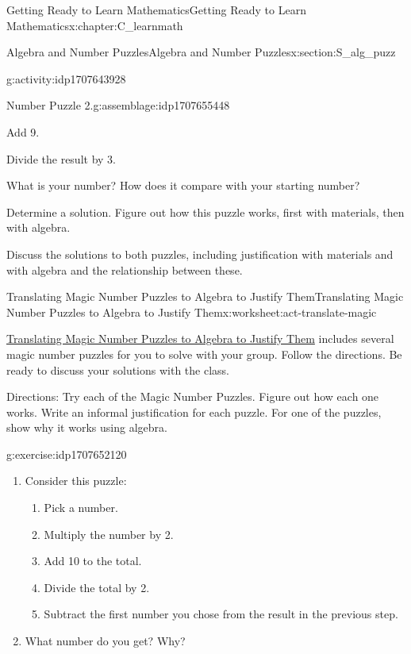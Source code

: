 \documentclass[oneside,10pt,]{book}
\numberwithin{equation}{chapter}
\begin{document}
\begin{chapterptx}{Getting Ready to Learn Mathematics}{}{Getting Ready to Learn Mathematics}{}{}{x:chapter:C_learnmath}
\begin{sectionptx}{Algebra and Number Puzzles}{}{Algebra and Number Puzzles}{}{}{x:section:S_alg_puzz}
\begin{activity}{}{g:activity:idp1707643928}
\begin{assemblage}{Number Puzzle 2.}{g:assemblage:idp1707655448}
\par
Add 9.%
\par
Divide the result by 3.%
\par
What is your number? How does it compare with your starting number?%
\end{assemblage}
 Determine a solution. Figure out how this puzzle works, first with materials, then with algebra.%
\par
Discuss the solutions to both puzzles, including justification with materials and with algebra and the relationship between these.%
\end{activity}%
%
%
\typeout{************************************************}
\typeout{************************************************}
%
\begin{worksheet-subsection}{Translating Magic Number Puzzles to Algebra to Justify Them}{}{Translating Magic Number Puzzles to Algebra to Justify Them}{}{}{x:worksheet:act-translate-magic}
\begin{introduction}{}%
\hyperref[x:worksheet:act-translate-magic]{Translating Magic Number Puzzles to Algebra to Justify Them} includes several magic number puzzles for you to solve with your group. Follow the directions. Be ready to discuss your solutions with the class.%
\par
Directions: Try each of the Magic Number Puzzles. Figure out how each one works. Write an informal justification for each puzzle. For one of the puzzles, show why it works using algebra.%
\end{introduction}%
\begin{divisionexercise}{1}{}{}{g:exercise:idp1707652120}%
\begin{enumerate}[font=\bfseries,label=(\alph*),ref=\alph*]
\item{}Consider this puzzle:%
\begin{enumerate}[label=(\alph*)]
\item{}Pick a number.%
\item{}Multiply the number by 2.%
\item{}Add 10 to the total.%
\item{}Divide the total by 2.%
\item{}Subtract the first number you chose from the result in the previous step.%
\end{enumerate}
%
\item{}What number do you get? Why?%

\end{enumerate}
\end{divisionexercise}
\end{worksheet-subsection}
\end{sectionptx}
\end{chapterptx}
\end{document}
